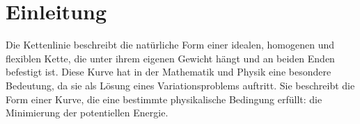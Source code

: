 %
%
%
%
\section{Einleitung\label{kettenlinie:section:Einleitung}}
Die Kettenlinie beschreibt die natürliche Form einer idealen, homogenen und flexiblen Kette, die unter ihrem eigenen Gewicht hängt und an beiden Enden befestigt ist.
%
%
%
Diese Kurve hat in der Mathematik und Physik eine besondere Bedeutung, da sie als Lösung eines Variationsproblems auftritt.
Sie beschreibt die Form einer Kurve, die eine bestimmte physikalische Bedingung erfüllt: die Minimierung der potentiellen Energie. 

